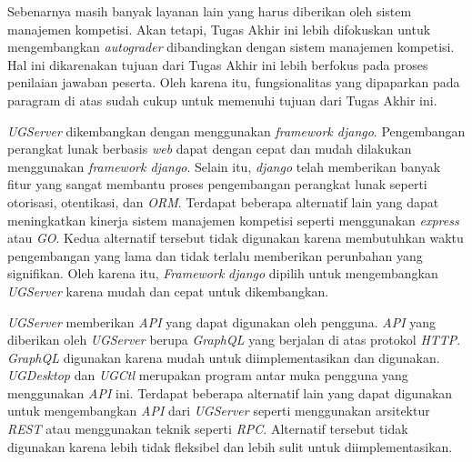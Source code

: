 \par Sebenarnya masih banyak layanan lain yang harus diberikan oleh sistem manajemen kompetisi. Akan tetapi, Tugas Akhir ini lebih difokuskan untuk mengembangkan \textit{autograder} dibandingkan dengan sistem manajemen kompetisi. Hal ini dikarenakan tujuan dari Tugas Akhir ini lebih berfokus pada proses penilaian jawaban peserta. Oleh karena itu, fungsionalitas yang dipaparkan pada paragram di atas sudah cukup untuk memenuhi tujuan dari Tugas Akhir ini.

\par \textit{UGServer} dikembangkan dengan menggunakan \textit{framework django}. Pengembangan perangkat lunak berbasis \textit{web} dapat dengan cepat dan mudah dilakukan menggunakan \textit{framework django}. Selain itu, \textit{django} telah memberikan banyak fitur yang sangat membantu proses pengembangan perangkat lunak seperti otorisasi, otentikasi, dan \textit{ORM}. Terdapat beberapa alternatif lain yang dapat meningkatkan kinerja sistem manajemen kompetisi seperti menggunakan \textit{express} atau \textit{GO}. Kedua alternatif tersebut tidak digunakan karena membutuhkan waktu pengembangan yang lama dan tidak terlalu memberikan perunbahan yang signifikan. Oleh karena itu, \textit{Framework} \textit{django} dipilih untuk mengembangkan \textit{UGServer} karena mudah dan cepat untuk dikembangkan.

\par \textit{UGServer} memberikan \textit{API} yang dapat digunakan oleh pengguna. \textit{API} yang diberikan oleh \textit{UGServer} berupa \textit{GraphQL} yang berjalan di atas protokol \textit{HTTP}. \textit{GraphQL} digunakan karena mudah untuk diimplementasikan dan digunakan. \textit{UGDesktop} dan \textit{UGCtl} merupakan program antar muka pengguna yang menggunakan \textit{API} ini. Terdapat beberapa alternatif lain yang dapat digunakan untuk mengembangkan \textit{API} dari \textit{UGServer} seperti menggunakan arsitektur \textit{REST} atau menggunakan teknik seperti \textit{RPC}. Alternatif tersebut tidak digunakan karena lebih tidak fleksibel dan lebih sulit untuk diimplementasikan.

